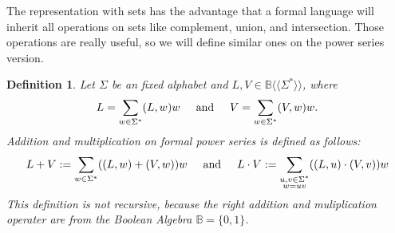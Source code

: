 \documentclass[12pt,letterpaper]{article}
\newtheorem{definition}{Definition}
\begin{document}
The representation with sets has the advantage that a formal language
will inherit all operations on sets like complement, union, and intersection.
Those operations are really useful, so we will define similar ones on the power
series version.
\begin{definition}
  Let $\Sigma$ be an fixed alphabet and $L, V \in \mathbb{B}\langle \langle
  \Sigma^* \rangle \rangle$, where
  \[
    L = \sum_{w \in \Sigma^*} (L,w)w \hspace{0.5cm} \text{and} \hspace{0.5cm}
    V = \sum_{w \in \Sigma^*} (V,w)w.
  \]
  Addition and multiplication on formal power series is defined
  as follows:\\
  \[
    L + V := \sum_{w \in \Sigma^*} ((L,w) + (V,w))w
    \hspace{0.5cm} \text{and} \hspace{0.5cm} 
    L \cdot V := \sum_{\substack{u,v \in \Sigma^* \\ w = uv }} 
      ((L,u) \cdot (V,v))w
  \]
  This definition is not recursive, because the right addition and 
  muliplication operater are from the Boolean Algebra 
  $\mathbb{B} = \{0,1\}$.
  \begin{center}
\end{center}
\end{definition}
\end{document}
